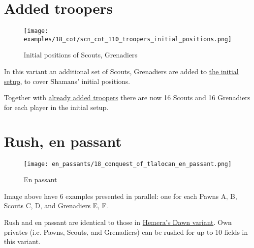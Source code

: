 \clearpage %

\section*{Added troopers}
\label{sec:Conquest of Tlalocan/Added troopers}

\vspace*{-1.2\baselineskip}
\noindent
\begin{figure}[!h]
\texttt{[image: examples/18\_cot/scn\_cot\_110\_troopers\_initial\_positions.png]}
\caption{Initial positions of Scouts, Grenadiers}
\label{fig:scn_cot_110_troopers_initial_positions}
\end{figure}

In this variant an additional set of Scouts, Grenadiers are added to
\hyperref[fig:18_conquest_of_tlalocan]{the initial setup},
to cover Shamans' initial positions.

Together with
\hyperref[fig:14_hemera_s_dawn]{already added troopers} there are now
16 Scouts and 16 Grenadiers for each player in the initial setup.

\clearpage %

\section*{Rush, en passant}
\label{sec:Conquest of Tlalocan/Rush, en passant}

\vspace*{-1.4\baselineskip}
\noindent
\begin{figure}[!h]
\texttt{[image: en\_passants/18\_conquest\_of\_tlalocan\_en\_passant.png]}
\vspace*{-1.3\baselineskip}
\caption{En passant}
\label{fig:18_conquest_of_tlalocan_en_passant}
\end{figure}

\vspace*{-0.5\baselineskip}
Image above have 6 examples presented in parallel: one for each Pawns A, B,
Scouts C, D, and Grenadiers E, F.

Rush and en passant are identical to those in
\hyperref[fig:14_hemera_s_dawn_en_passant]{Hemera's Dawn variant}.
Own privates (i.e. Pawns, Scouts, and Grenadiers) can be rushed for up to 10
fields in this variant.

